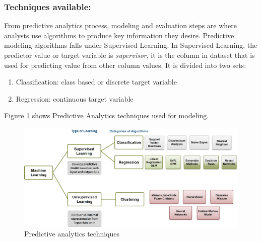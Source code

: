 \documentclass[runningheads]{llncs}
\begin{document}
\subsubsection{Techniques available:}
From predictive analytics process, modeling and evaluation steps are where analysts use algorithms to produce key information they desire. Predictive modeling algorithms \cite{7} falls under Supervised Learning. In Supervised Learning, the predictor value or target variable is \textit{supervisor}, it is the column in dataset that is used for predicting value from other column values. It is divided into two sets:
\begin{enumerate}
	\item Classification: class based or discrete target variable
	\item Regression: continuous target variable 
\end{enumerate} 
Figure \ref{fig:Figure2} shows Predictive Analytics techniques used for modeling\cite{8}.
\begin{figure}[htbp]
	\centering
	
	\includegraphics[scale=0.35]{Figure2.jpg}
	\caption{Predictive analytics techniques}
	\label{fig:Figure2}
	
\end{figure}

\vspace{-4mm}
\end{document}
